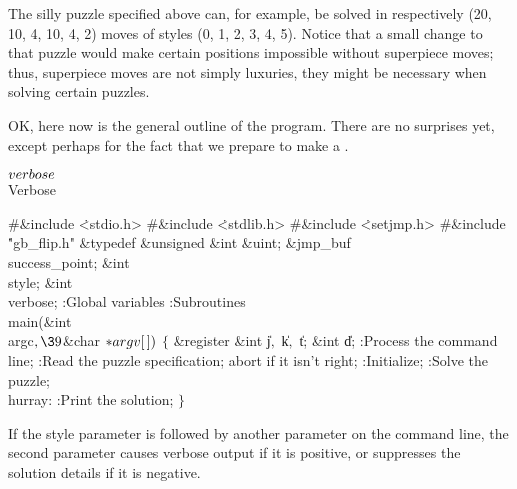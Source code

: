 The silly puzzle specified above can, for example, be solved in
respectively (20, 10, 4, 10, 4, 2) moves of styles (0, 1, 2, 3, 4, 5).
Notice that a small change to that puzzle would make certain positions
impossible without superpiece moves; thus, superpiece moves are not
simply luxuries, they might be necessary when solving certain puzzles.

\fi

OK, here now is the general outline of the program.
There are no surprises yet, except perhaps for the fact that we
prepare to make a .

\Y\B\4\D$\\{verbose}$ \5
\\{Verbose}\par
\Y\B\8\#\&{include} \.{<stdio.h>}\6
\8\#\&{include} \.{<stdlib.h>}\6
\8\#\&{include} \.{<setjmp.h>}\6
\8\#\&{include} \.{"gb\_flip.h"}\6
\&{typedef} \&{unsigned} \&{int} \&{uint};\6
\&{jmp\_buf} \\{success\_point};\6
\&{int} \\{style};\6
\&{int} \\{verbose};\7
:Global variables\X\6
:Subroutines\X\7
\\{main}(\&{int} \\{argc}${},\39{}$\&{char} ${}{*}\\{argv}[\,]){}$\1\1\2\2\6
${}\{{}$\1\6
\&{register} \&{int} \|j${},{}$ \|k${},{}$ \|t;\6
\&{int} \|d;\7
:Process the command line\X;\6
:Read the puzzle specification; abort if it isn't right\X;\6
:Initialize\X;\6
:Solve the puzzle\X;\6
\4\\{hurray}:\5
:Print the solution\X;\6
\4${}\}{}$\2\par
\fi

If the style parameter is followed by another parameter on
the command
line, the second parameter causes verbose output if it is positive,
or suppresses the solution details if it is negative.

